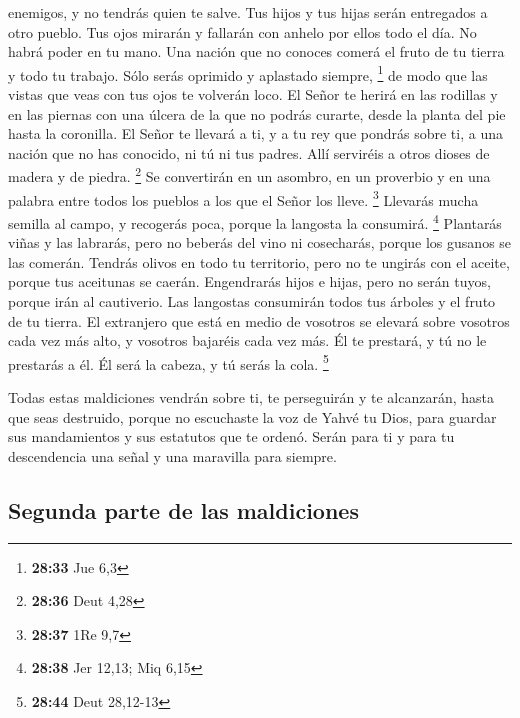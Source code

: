 \begin{paracol}{2}
enemigos, y no tendrás quien te salve.  Tus hijos y tus
hijas serán entregados a otro pueblo. Tus ojos mirarán y fallarán con
anhelo por ellos todo el día. No habrá poder en tu mano. 
Una nación que no conoces comerá el fruto de tu tierra y todo tu
trabajo. Sólo serás oprimido y aplastado siempre, \footnote{\textbf{28:33}
  Jue 6,3}  de modo que las vistas que veas con tus ojos
te volverán loco.  El Señor te herirá en las rodillas y
en las piernas con una úlcera de la que no podrás curarte, desde la
planta del pie hasta la coronilla.  El Señor te llevará a
ti, y a tu rey que pondrás sobre ti, a una nación que no has conocido,
ni tú ni tus padres. Allí serviréis a otros dioses de madera y de
piedra. \footnote{\textbf{28:36} Deut 4,28}  Se
convertirán en un asombro, en un proverbio y en una palabra entre todos
los pueblos a los que el Señor los lleve. \footnote{\textbf{28:37} 1Re
  9,7}  Llevarás mucha semilla al campo, y recogerás
poca, porque la langosta la consumirá. \footnote{\textbf{28:38} Jer
  12,13; Miq 6,15}  Plantarás viñas y las labrarás, pero
no beberás del vino ni cosecharás, porque los gusanos se las comerán.
 Tendrás olivos en todo tu territorio, pero no te ungirás
con el aceite, porque tus aceitunas se caerán. 
Engendrarás hijos e hijas, pero no serán tuyos, porque irán al
cautiverio.  Las langostas consumirán todos tus árboles y
el fruto de tu tierra.  El extranjero que está en medio
de vosotros se elevará sobre vosotros cada vez más alto, y vosotros
bajaréis cada vez más.  Él te prestará, y tú no le
prestarás a él. Él será la cabeza, y tú serás la cola. \footnote{\textbf{28:44}
  Deut 28,12-13}

 Todas estas maldiciones vendrán sobre ti, te perseguirán
y te alcanzarán, hasta que seas destruido, porque no escuchaste la voz
de Yahvé tu Dios, para guardar sus mandamientos y sus estatutos que te
ordenó.  Serán para ti y para tu descendencia una señal y
una maravilla para siempre.

\hypertarget{segunda-parte-de-las-maldiciones}{%
\subsection{Segunda parte de las
maldiciones}\label{segunda-parte-de-las-maldiciones}}


\end{paracol}
